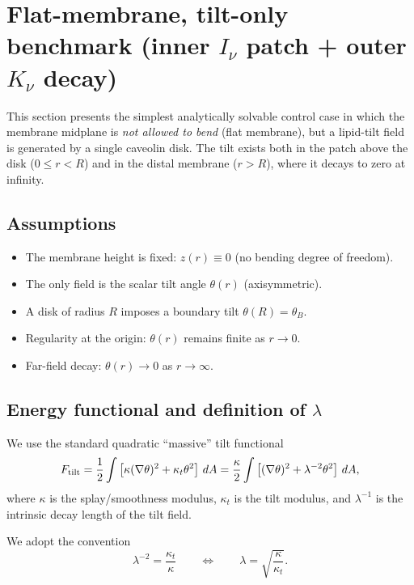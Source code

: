 \documentclass[11pt]{article}
\begin{document}
\section{Flat-membrane, tilt-only benchmark (inner $I_\nu$ patch + outer $K_\nu$ decay)}
\label{sec:tilt_only_flat_two_region}

This section presents the simplest analytically solvable control case in which
the membrane midplane is \emph{not allowed to bend} (flat membrane),
but a lipid-tilt field is generated by a single caveolin disk.
The tilt exists both in the patch above the disk ($0\le r < R$) and in the distal
membrane ($r>R$), where it decays to zero at infinity.

\subsection{Assumptions}

\begin{itemize}
\item The membrane height is fixed: $z(r)\equiv 0$ (no bending degree of freedom).
\item The only field is the scalar tilt angle $\theta(r)$ (axisymmetric).
\item A disk of radius $R$ imposes a boundary tilt $\theta(R)=\theta_B$.
\item Regularity at the origin: $\theta(r)$ remains finite as $r\to 0$.
\item Far-field decay: $\theta(r)\to 0$ as $r\to\infty$.
\end{itemize}

\subsection{Energy functional and definition of $\lambda$}

We use the standard quadratic ``massive'' tilt functional
\begin{equation}
F_{\rm tilt}
=
\frac{1}{2}\int \left[\kappa(\nabla \theta)^2 + \kappa_t \theta^2\right]\, dA
=
\frac{\kappa}{2}\int \left[(\nabla \theta)^2 + \lambda^{-2} \theta^2\right]\, dA ,
\end{equation}
where $\kappa$ is the splay/smoothness modulus, $\kappa_t$ is the tilt modulus,
and $\lambda^{-1}$ is the intrinsic decay length of the tilt field.

We adopt the convention
\begin{equation}
\boxed{\lambda^{-2}=\frac{\kappa_t}{\kappa}}
\qquad \Longleftrightarrow \qquad
\boxed{\lambda=\sqrt{\frac{\kappa}{\kappa_t}}}.
\end{equation}
\end{document}
